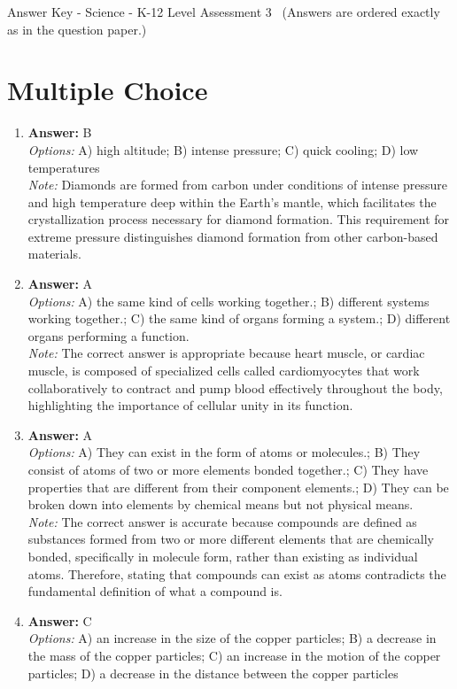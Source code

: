 \documentclass[12pt]{article}
\begin{document}
\begin{center}
Answer Key - Science - K-12 Level Assessment 3 \
\small (Answers are ordered exactly as in the question paper.)
\end{center}

\section*{Multiple Choice}
\begin{enumerate}[label=\arabic*.]
\item \textbf{Answer:} B
\\ \textit{Options:} A) high altitude; B) intense pressure; C) quick cooling; D) low temperatures
\\ \textit{Note:} Diamonds are formed from carbon under conditions of intense pressure and high temperature deep within the Earth's mantle, which facilitates the crystallization process necessary for diamond formation. This requirement for extreme pressure distinguishes diamond formation from other carbon-based materials.
\item \textbf{Answer:} A
\\ \textit{Options:} A) the same kind of cells working together.; B) different systems working together.; C) the same kind of organs forming a system.; D) different organs performing a function.
\\ \textit{Note:} The correct answer is appropriate because heart muscle, or cardiac muscle, is composed of specialized cells called cardiomyocytes that work collaboratively to contract and pump blood effectively throughout the body, highlighting the importance of cellular unity in its function.
\item \textbf{Answer:} A
\\ \textit{Options:} A) They can exist in the form of atoms or molecules.; B) They consist of atoms of two or more elements bonded together.; C) They have properties that are different from their component elements.; D) They can be broken down into elements by chemical means but not physical means.
\\ \textit{Note:} The correct answer is accurate because compounds are defined as substances formed from two or more different elements that are chemically bonded, specifically in molecule form, rather than existing as individual atoms. Therefore, stating that compounds can exist as atoms contradicts the fundamental definition of what a compound is.
\item \textbf{Answer:} C
\\ \textit{Options:} A) an increase in the size of the copper particles; B) a decrease in the mass of the copper particles; C) an increase in the motion of the copper particles; D) a decrease in the distance between the copper particles

\end{enumerate}
\end{document}
